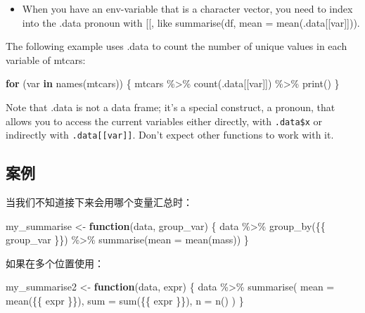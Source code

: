 \documentclass[
]{book}
\newenvironment{Shaded}{\begin{snugshade}}{\end{snugshade}}
\newcommand{\AttributeTok}[1]{\textcolor[rgb]{0.77,0.63,0.00}{#1}}
\newcommand{\ControlFlowTok}[1]{\textcolor[rgb]{0.13,0.29,0.53}{\textbf{#1}}}
\newcommand{\FunctionTok}[1]{\textcolor[rgb]{0.00,0.00,0.00}{#1}}
\newcommand{\NormalTok}[1]{#1}
\newcommand{\OtherTok}[1]{\textcolor[rgb]{0.56,0.35,0.01}{#1}}
\newcommand{\SpecialCharTok}[1]{\textcolor[rgb]{0.00,0.00,0.00}{#1}}
\providecommand{\tightlist}{%
  \setlength{\itemsep}{0pt}\setlength{\parskip}{0pt}}
\begin{document}
\begin{itemize}
\tightlist
\item
  When you have an env-variable that is a character vector, you need to index into the .data pronoun with {[}{[}, like summarise(df, mean = mean(.data{[}{[}var{]}{]})).
\end{itemize}

The following example uses .data to count the number of unique values in each variable of mtcars:

\begin{Shaded}
\begin{Highlighting}[]
\ControlFlowTok{for}\NormalTok{ (var }\ControlFlowTok{in} \FunctionTok{names}\NormalTok{(mtcars)) \{}
\NormalTok{  mtcars }\SpecialCharTok{\%\textgreater{}\%} \FunctionTok{count}\NormalTok{(.data[[var]]) }\SpecialCharTok{\%\textgreater{}\%} \FunctionTok{print}\NormalTok{()}
\NormalTok{\}}
\end{Highlighting}
\end{Shaded}

Note that .data is not a data frame; it's a special construct, a pronoun, that allows you to access the current variables either directly, with \texttt{.data\$x} or indirectly with \texttt{.data{[}{[}var{]}{]}}. Don't expect other functions to work with it.

\hypertarget{ux6848ux4f8b-1}{%
\subsection{案例}\label{ux6848ux4f8b-1}}

当我们不知道接下来会用哪个变量汇总时：

\begin{Shaded}
\begin{Highlighting}[]
\NormalTok{my\_summarise }\OtherTok{\textless{}{-}} \ControlFlowTok{function}\NormalTok{(data, group\_var) \{}
\NormalTok{  data }\SpecialCharTok{\%\textgreater{}\%}
    \FunctionTok{group\_by}\NormalTok{(\{\{ group\_var \}\}) }\SpecialCharTok{\%\textgreater{}\%}
    \FunctionTok{summarise}\NormalTok{(}\AttributeTok{mean =} \FunctionTok{mean}\NormalTok{(mass))}
\NormalTok{\}}
\end{Highlighting}
\end{Shaded}

如果在多个位置使用：

\begin{Shaded}
\begin{Highlighting}[]
\NormalTok{my\_summarise2 }\OtherTok{\textless{}{-}} \ControlFlowTok{function}\NormalTok{(data, expr) \{}
\NormalTok{  data }\SpecialCharTok{\%\textgreater{}\%} \FunctionTok{summarise}\NormalTok{(}
    \AttributeTok{mean =} \FunctionTok{mean}\NormalTok{(\{\{ expr \}\}),}
    \AttributeTok{sum =} \FunctionTok{sum}\NormalTok{(\{\{ expr \}\}),}
    \AttributeTok{n =} \FunctionTok{n}\NormalTok{()}
\NormalTok{  )}
\NormalTok{\}}
\end{Highlighting}
\end{Shaded}
\end{document}
